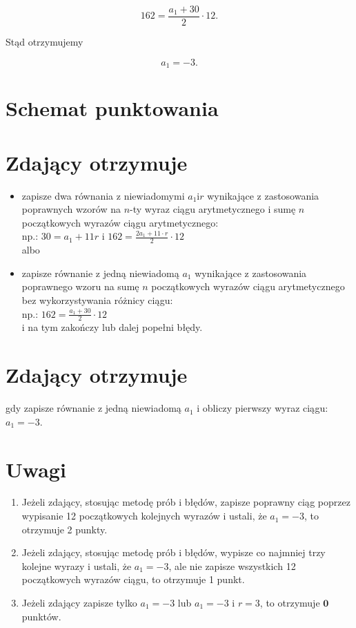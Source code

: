 \documentclass[10pt]{article}
\begin{document}
$$
162=\frac{a_{1}+30}{2} \cdot 12 .
$$

Stąd otrzymujemy

$$
a_{1}=-3 .
$$

\section*{Schemat punktowania}
\section*{Zdający otrzymuje}
\begin{itemize}
  \item zapisze dwa równania z niewiadomymi $a_{1} \mathrm{i} r$ wynikające z zastosowania poprawnych wzorów na $n$-ty wyraz ciągu arytmetycznego i sumę $n$ początkowych wyrazów ciągu arytmetycznego:\\
np.: $30=a_{1}+11 r$ i $162=\frac{2 a_{1}+11 \cdot r}{2} \cdot 12$\\
albo
  \item zapisze równanie z jedną niewiadomą $a_{1}$ wynikające z zastosowania poprawnego wzoru na sumę $n$ początkowych wyrazów ciągu arytmetycznego bez wykorzystywania różnicy ciągu:\\
np.: $162=\frac{a_{1}+30}{2} \cdot 12$\\
i na tym zakończy lub dalej popełni błędy.
\end{itemize}

\section*{Zdający otrzymuje}
gdy zapisze równanie z jedną niewiadomą $a_{1}$ i obliczy pierwszy wyraz ciągu: $a_{1}=-3$.

\section*{Uwagi}
\begin{enumerate}
  \item Jeżeli zdający, stosując metodę prób i błędów, zapisze poprawny ciąg poprzez wypisanie 12 początkowych kolejnych wyrazów i ustali, że $a_{1}=-3$, to otrzymuje 2 punkty.
  \item Jeżeli zdający, stosując metodę prób i błędów, wypisze co najmniej trzy kolejne wyrazy i ustali, że $a_{1}=-3$, ale nie zapisze wszystkich 12 początkowych wyrazów ciągu, to otrzymuje 1 punkt.
  \item Jeżeli zdający zapisze tylko $a_{1}=-3$ lub $a_{1}=-3$ i $r=3$, to otrzymuje $\mathbf{0}$ punktów.
\end{enumerate}
\end{document}
